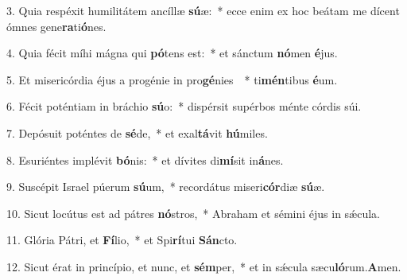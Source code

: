 \item 3. Quia respéxit humilitátem ancíllæ \textbf{sú}æ:~* ecce enim ex hoc beátam me dícent ómnes gene\textbf{ra}ti\textbf{ó}nes.

\item 4. Quia fécit míhi mágna qui \textbf{pó}tens est:~* et sánctum \textbf{nó}men \textbf{é}jus.

\item 5. Et misericórdia éjus a progénie in pro\textbf{gé}nies ~* ti\textbf{mén}tibus \textbf{é}um.

\item 6. Fécit poténtiam in bráchio \textbf{sú}o:~* dispérsit supérbos ménte córdis súi.

\item 7. Depósuit poténtes de \textbf{sé}de,~* et exal\textbf{tá}vit \textbf{hú}miles.

\item 8. Esuriéntes implévit \textbf{bó}nis:~* et dívites di\textbf{mí}sit in\textbf{á}nes.

\item 9. Suscépit Israel púerum \textbf{sú}um,~* recordátus miseri\textbf{cór}diæ \textbf{sú}æ.

\item 10. Sicut locútus est ad pátres \textbf{nó}stros,~* Abraham et sémini éjus in sǽcula.

\item 11. Glória Pátri, et \textbf{Fí}lio,~* et Spi\textbf{rí}tui \textbf{Sán}cto.

\item 12. Sicut érat in princípio, et nunc, et \textbf{sém}per,~* et in sǽcula sæcu\textbf{ló}rum.\textbf{A}men.